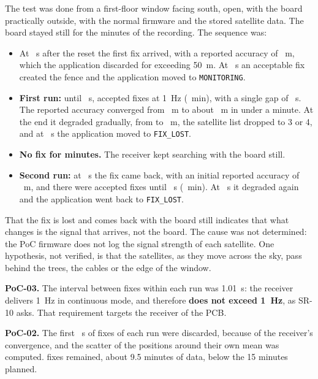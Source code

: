 The test was done from a first-floor window facing south, open, with the board practically outside, with the
normal firmware and the stored satellite data. The board stayed still for the \dStaticRecordingMinutes{}
minutes of the recording. The sequence was:

\begin{itemize}
  \item At \dStaticFirstFixS~s after the reset the first fix arrived, with a reported accuracy of
        \dStaticFirstFixAcc~m, which the application discarded for exceeding 50~m. At \dStaticFenceS~s an
        acceptable fix created the fence and the application moved to \texttt{MONITORING}.
  \item \textbf{First run:} until \dStaticRunOneEndS~s, \dStaticRunOneFixes{} accepted fixes at 1~Hz
        (\dStaticRunOneMinutes~min), with a single gap of \dStaticMaxGapS~s. The reported accuracy converged
        from \dStaticAccStart~m to about \dStaticAccConverged~m in under a minute. At the end it degraded
        gradually, from \dStaticTailAccFrom{} to \dStaticTailAccTo~m, the satellite list dropped to 3 or 4, and
        at \dStaticLostFirstS~s the application moved to \texttt{FIX\_LOST}.
  \item \textbf{No fix for \dStaticGapMinutes{} minutes.} The receiver kept searching with the board still.
  \item \textbf{Second run:} at \dStaticRunTwoStartS~s the fix came back, with an initial reported accuracy of
        \dStaticRunTwoFirstAcc~m, and there were \dStaticRunTwoFixes{} accepted fixes until
        \dStaticRunTwoEndS~s (\dStaticRunTwoMinutes~min). At \dStaticLostSecondS~s it degraded again and the
        application went back to \texttt{FIX\_LOST}.
\end{itemize}

That the fix is lost and comes back with the board still indicates that what changes is the signal that
arrives, not the board. The cause was not determined: the PoC firmware does not log the signal strength of
each satellite. One hypothesis, not verified, is that the satellites, as they move across the sky, pass behind
the trees, the cables or the edge of the window.

\textbf{PoC-03.} The interval between fixes within each run was 1.01~s: the receiver delivers 1~Hz in
continuous mode, and therefore \textbf{does not exceed 1~Hz}, as SR-10 asks. That requirement targets the
receiver of the PCB.

\textbf{PoC-02.} The first \dStaticSkipS~s of fixes of each run were discarded, because of the receiver's
convergence, and the scatter of the positions around their own mean was computed. \dStaticBothUsed{} fixes
remained, about 9.5 minutes of data, below the 15 minutes planned.

